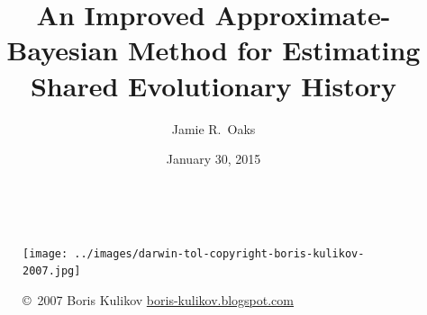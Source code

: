 

\newcommand{\allParameters}[1]{\ensuremath{\theta_{#1}}\xspace}



\title[Estimating shared history]{An Improved Approximate-Bayesian Method for Estimating Shared
Evolutionary History}

\author[J.\ Oaks]{
    Jamie R.\ Oaks
}

\date{January 30, 2015}


\begin{frame}
    \begin{columns}[c]
            \maketitle
            \begin{figure}
                \begin{center}
                \texttt{[image: ../images/darwin-tol-copyright-boris-kulikov-2007.jpg]}
                \caption{\tiny \copyright~2007 Boris Kulikov \href{http://boris-kulikov.blogspot.com/}{boris-kulikov.blogspot.com}}
                \end{center}
            \end{figure}
    \end{columns}
\end{frame}


